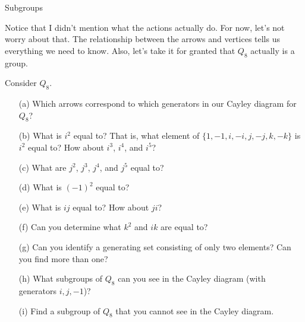 \begin{section}{Subgroups}
\begin{center}
\end{center}

Notice that I didn't mention what the actions actually do.  For now, let's not worry about that.  The relationship between the arrows and vertices tells us everything we need to know.  Also, let's take it for granted that $Q_8$ actually is a group.

\begin{exercise}
Consider $Q_8$.
\begin{enumerate}
\item[(a)] Which arrows correspond to which generators in our Cayley diagram for $Q_8$?
\item[(b)] What is $i^2$ equal to?  That is, what element of $\{1,-1,i,-i,j,-j,k,-k\}$ is $i^2$ equal to?  How about $i^3$, $i^4$, and $i^5$?
\item[(c)] What are $j^2$, $j^3$, $j^4$, and $j^5$ equal to?
\item[(d)] What is $(-1)^2$ equal to?
\item[(e)] What is $ij$ equal to?  How about $ji$?
\item[(f)] Can you determine what $k^2$ and $ik$ are equal to?
\item[(g)] Can you identify a generating set consisting of only two elements?  Can you find more than one?
\item[(h)] What subgroups of $Q_8$ can you see in the Cayley diagram (with generators $i, j, -1$)?
\item[(i)] Find a subgroup of $Q_8$ that you cannot see in the Cayley diagram.
\end{enumerate}
\end{exercise}

\end{section}

